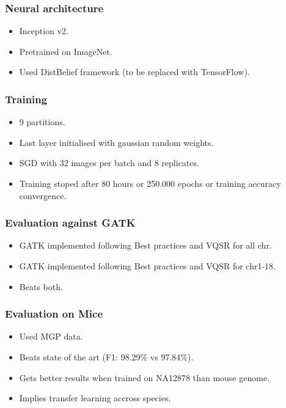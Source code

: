 \documentclass{beamer}
\begin{document}
\begin{frame}
    \frametitle{Neural architecture}

    \begin{itemize}
        \item Inception v2.
        \item Pretrained on ImageNet.
        \item Used DistBelief framework (to be replaced with TensorFlow).
    \end{itemize}
\end{frame}

\begin{frame}
    \frametitle{Training}

    \begin{itemize}
        \item 9 partitions.
        \item Last layer initialised with gaussian random weights.
        \item SGD with 32 images per batch and 8 replicates.
        \item Training stoped after 80 hours or 250.000 epochs or training accuracy convergence.
    \end{itemize}
\end{frame}

\begin{frame}
    \frametitle{Evaluation against GATK}

    \begin{itemize}
        \item GATK implemented following Best practices and VQSR for all chr.
        \item GATK implemented following Best practices and VQSR for chr1-18.
        \item Beats both.
    \end{itemize}
\end{frame}

\begin{frame}
    \frametitle{Evaluation on Mice}

    \begin{itemize}
        \item Used MGP data.
        \item Beats state of the art (F1: 98.29\% vs 97.84\%).
        \item Gets better results when trained on NA12878 than mouse genome.
        \item Implies transfer learning accross species.
    \end{itemize}
\end{frame}
\end{document}
